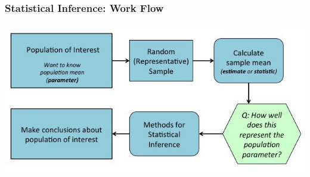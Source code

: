 \documentclass[12pt, 
hyperref={colorlinks=true, linkcolor=blue, urlcolor=cyan}]{beamer}
\begin{document}
\begin{frame}
\frametitle{Statistical Inference: Work Flow} %

\includegraphics[width=\textwidth]{./inference}

\end{frame}
\end{document}
